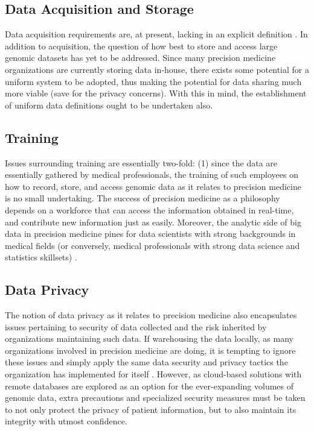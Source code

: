 \subsection{Data Acquisition and Storage}

Data acquisition requirements are, at present, lacking in an explicit definition \cite{ehealth2017}. In addition to 
acquisition, the question of how best to store and access large genomic datasets has yet to be addressed. Since many 
precision medicine organizations are currently storing data in-house, there exists some potential for a uniform system to 
be adopted, thus making the potential for data sharing much more viable (save for the privacy concerns). With this in mind, 
the establishment of uniform data definitions ought to be undertaken also.

\subsection{Training}

Issues surrounding training are essentially two-fold: (1) since the data are essentially gathered by medical professionals, 
the training of such employees on how to record, store, and access genomic data as it relates to precision medicine is no 
small undertaking. The success of precision medicine as a philosophy depends on a workforce that can access the information 
obtained in real-time, and contribute new information just as easily. Moreover, the analytic side of big data in precision 
medicine pines for data scientists with strong backgrounds in medical fields (or conversely, medical professionals with 
strong data science and statistics skillsets) \cite{He2017}.

\subsection{Data Privacy}

The notion of data privacy as it relates to precision medicine also encapsulates issues pertaining to security of data 
collected and the risk inherited by organizations maintaining such data. If warehousing the data locally, as many 
organizations involved in precision medicine are doing, it is tempting to ignore these issues and simply apply the same 
data security and privacy tactics the organization has implemented for itself \cite{ehealth2017} \cite{He2017}. However, as 
cloud-based solutions with remote databases are explored as an option for the ever-expanding volumes of genomic data, extra 
precautions and specialized security measures must be taken to not only protect the privacy of patient information, but to 
also maintain its integrity with utmost confidence.

